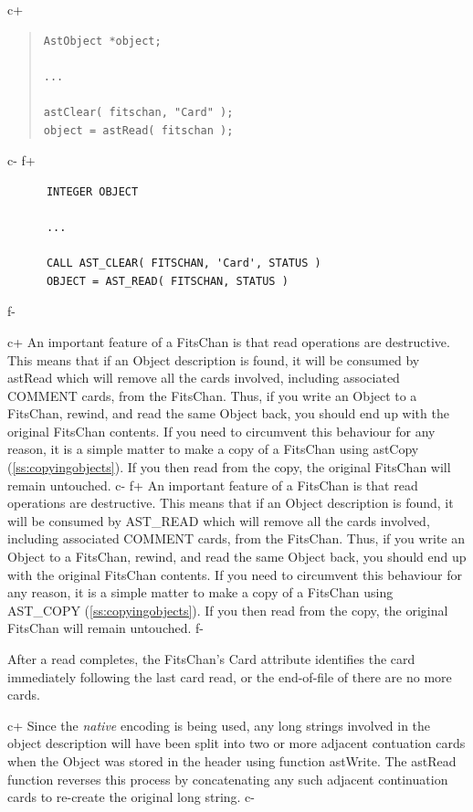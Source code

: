 \documentclass[twoside,11pt]{article}
\newcommand{\secref}[1]{\S\ref{#1}}
\renewcommand{\secref}[1]{\ref{#1}}
\begin{document}
c+
\begin{quote}
\small
\begin{verbatim}
AstObject *object;

...

astClear( fitschan, "Card" );
object = astRead( fitschan );
\end{verbatim}
\normalsize
\end{quote}
c-
f+
\small
\begin{verbatim}
      INTEGER OBJECT

      ...

      CALL AST_CLEAR( FITSCHAN, 'Card', STATUS )
      OBJECT = AST_READ( FITSCHAN, STATUS )
\end{verbatim}
\normalsize
f-

c+
An important feature of a FitsChan is that read operations are
destructive. This means that if an Object description is found, it
will be consumed by astRead which will remove all the cards involved,
including associated COMMENT cards, from the FitsChan. Thus, if you
write an Object to a FitsChan, rewind, and read the same Object back,
you should end up with the original FitsChan contents.  If you need to
circumvent this behaviour for any reason, it is a simple matter to
make a copy of a FitsChan using astCopy
(\secref{ss:copyingobjects}). If you then read from the copy, the
original FitsChan will remain untouched.
c-
f+
An important feature of a FitsChan is that read operations are
destructive. This means that if an Object description is found, it
will be consumed by AST\_READ which will remove all the cards
involved, including associated COMMENT cards, from the FitsChan. Thus,
if you write an Object to a FitsChan, rewind, and read the same Object
back, you should end up with the original FitsChan contents.  If you
need to circumvent this behaviour for any reason, it is a simple
matter to make a copy of a FitsChan using AST\_COPY
(\secref{ss:copyingobjects}). If you then read from the copy, the
original FitsChan will remain untouched.
f-

After a read completes, the FitsChan's Card attribute identifies the
card immediately following the last card read, or the end-of-file of
there are no more cards.

c+
Since the {\em native} encoding is being used, any long strings involved
in the object description will have been split into two or more adjacent
contuation cards when the Object was stored in the header using function
astWrite. The astRead function reverses this process by concatenating any
such adjacent continuation cards to re-create the original long string.
c-
\end{document}
